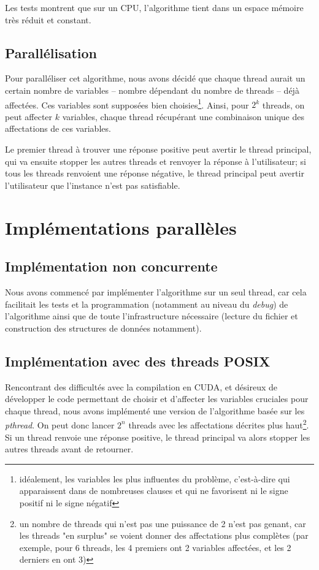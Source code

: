 \documentclass{article}
\newcommand{\cuda}{\textsc{CUDA}}
\begin{document}
Les tests montrent que sur un \textsc{CPU}, l'algorithme tient dans un espace mémoire très réduit et constant.


\subsection{Parallélisation}
    Pour paralléliser cet algorithme, nous avons décidé que chaque thread aurait un certain nombre de variables -- nombre dépendant du nombre de threads -- déjà affectées. Ces variables sont supposées bien choisies\footnote{idéalement, les variables les plus \og influentes \fg du problème, c'est-à-dire qui apparaissent dans de nombreuses clauses et qui ne favorisent ni le signe positif ni le signe négatif}. Ainsi, pour $2^{k}$ threads, on peut affecter $k$ variables, chaque thread récupérant une combinaison unique des affectations de ces variables.

    Le premier thread à trouver une réponse positive peut avertir le thread principal, qui va ensuite stopper les autres threads et renvoyer la réponse à l'utilisateur; si tous les threads renvoient une réponse négative, le thread principal peut avertir l'utilisateur que l'instance n'est pas satisfiable.


\section{Implémentations parallèles}
\subsection{Implémentation non concurrente}
    Nous avons commencé par implémenter l'algorithme sur un seul thread, car cela facilitait les tests et la programmation (notamment au niveau du \emph{debug}) de l'algorithme ainsi que de toute l'infrastructure nécessaire (lecture du fichier et construction des structures de données notamment). 

\subsection{Implémentation avec des threads \textsc{POSIX}}
Rencontrant des difficultés avec la compilation en \cuda, et désireux de développer le code permettant de choisir et d'affecter les variables \og cruciales \fg pour chaque thread, nous avons implémenté une version de l'algorithme basée sur les \emph{pthread}. On peut donc lancer $2^{n}$ threads avec les affectations décrites plus haut\footnote{un nombre de threads qui n'est pas une puissance de 2 n'est pas genant, car les threads "en surplus" se voient donner des affectations plus complètes (par exemple, pour 6 threads, les 4 premiers ont 2 variables affectées, et les 2 derniers en ont 3)}. Si un thread renvoie une réponse positive, le thread principal va alors stopper les autres threads avant de retourner.
\end{document}
